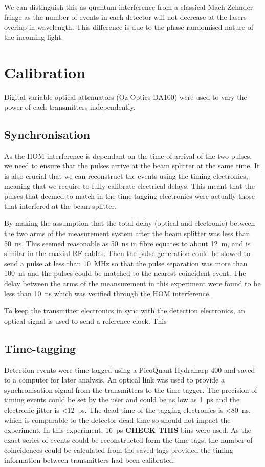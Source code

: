 We can distinguish this as quantum interference from a classical Mach-Zehnder fringe as the number of events in each detector will not decrease at the lasers overlap in wavelength. This difference is due to the phase randomised nature of the incoming light.

\section{Calibration}

Digital variable optical attenuators (Oz Optics DA100) were used to vary the power of each transmitters independently. 

\subsection{Synchronisation}

As the \ac{HOM} interference is dependant on the time of arrival of the two pulses, we need to ensure that the pulses arrive at the beam splitter at the same time. It is also crucial that we can reconstruct the events using the timing electronics, meaning that we require to fully calibrate electrical delays. This meant that the pulses that deemed to match in the time-tagging electronics were actually those that interfered at the beam splitter. 

By making the assumption that the total delay (optical and electronic) between the two arms of the measurement system after the beam splitter was less than \SI{50}{\ns}. This seemed reasonable as \SI{50}{\ns} in fibre equates to about \SI{12}{\m}, and is similar in the coaxial RF cables. Then the pulse generation could be slowed to send a pulse at less than \SI{10}{\MHz} so that the pulse separation was more than \SI{100}{\ns} and the pulses could be matched to the nearest coincident event. The delay between the arms of the meansurement in this experiment were found to be less than \SI{10}{\ns} which was verified through the \ac{HOM} interference.

To keep the transmitter electronics in sync with the detection electronics, an optical signal is used to send a reference clock. This 

\subsection{Time-tagging}

Detection events were time-tagged using a PicoQuant Hydraharp 400 and saved to a computer for later analysis. An optical link was used to provide a synchronisation signal from the transmitters to the time-tagger. The precision of timing events could be set by the user and could be as low as \SI{1}{\ps} and the electronic jitter is \SI{<12}{\ps}. The dead time of the tagging electronics is \SI{<80}{\ns}, which is comparable to the detector dead time so should not impact the experiment. In this experiment, \SI{16}{\ps} \textbf{CHECK THIS} bins were used. As the exact series of events could be reconstructed form the time-tags, the number of coincidences could be calculated from the saved tags provided the timing information between transmitters had been calibrated.

